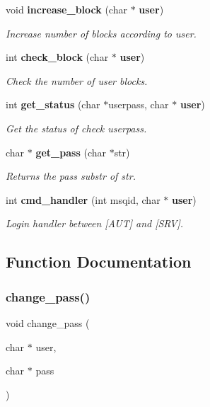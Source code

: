\begin{DoxyCompactItemize}
void \textbf{ increase\+\_\+block} (char $\ast$\textbf{ user})
\begin{DoxyCompactList}\small\item\em Increase number of blocks according to user. \end{DoxyCompactList}\item 
int \textbf{ check\+\_\+block} (char $\ast$\textbf{ user})
\begin{DoxyCompactList}\small\item\em Check the number of user blocks. \end{DoxyCompactList}\item 
int \textbf{ get\+\_\+status} (char $\ast$userpass, char $\ast$\textbf{ user})
\begin{DoxyCompactList}\small\item\em Get the status of check userpass. \end{DoxyCompactList}\item 
char $\ast$ \textbf{ get\+\_\+pass} (char $\ast$str)
\begin{DoxyCompactList}\small\item\em Returns the pass substr of str. \end{DoxyCompactList}\item 
int \textbf{ cmd\+\_\+handler} (int msqid, char $\ast$\textbf{ user})
\begin{DoxyCompactList}\small\item\em Login handler between [A\+UT] and [S\+RV]. \end{DoxyCompactList}\end{DoxyCompactItemize}


\subsection{Function Documentation}
\mbox{\label{auth_8c_a94e83fe1538f3e714f97775e42b00843}} 
\subsubsection{change\+\_\+pass()}
{\footnotesize\ttfamily void change\+\_\+pass (\begin{DoxyParamCaption}\item[{char $\ast$}]{user,  }\item[{char $\ast$}]{pass }\end{DoxyParamCaption})}



